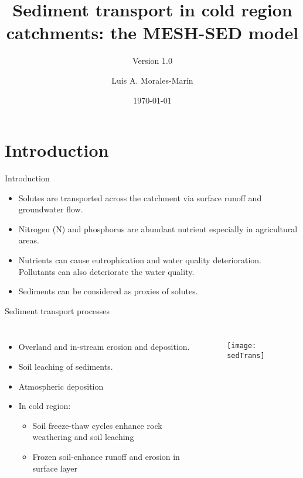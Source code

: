 \documentclass{beamer}
\title[MESH-SED model]{Sediment transport in cold region catchments: the MESH-SED model}
\subtitle{Version 1.0}
\author{Luis A. Morales-Mar\'{i}n}
\institute[GIWS]{Global Institute for Water Security (GIWS)}
\date{\today}
\begin{document}
\begin{frame}
\titlepage
\end{frame}

\begin{frame}
	\tableofcontents
\end{frame}

\section{Introduction}

\begin{frame}{Introduction}
\begin{itemize}
  \item Solutes are transported across the catchment via surface runoff and groundwater flow.
  \item Nitrogen (N) and phosphorus are abundant nutrient especially in agricultural areas.
  \item Nutrients can cause eutrophication and water quality deterioration. Pollutants can also deteriorate the water quality.
  \item Sediments can be considered as proxies of solutes.
\end{itemize}

\vskip 1cm


\end{frame}


\begin{frame}{Sediment transport processes}
\begin{columns}
\begin{itemize}
\item Overland and in-stream erosion and deposition.
\item Soil leaching of sediments.
\item Atmospheric deposition
\item In cold region:
\begin{itemize}
\item Soil freeze-thaw cycles enhance rock weathering and soil leaching
\item Frozen soil-enhance runoff and erosion in surface layer
\end{itemize}
\end{itemize}
\begin{figure}
\texttt{[image: sedTrans]}
\end{figure}
\end{columns}

\end{frame}
\end{document}
